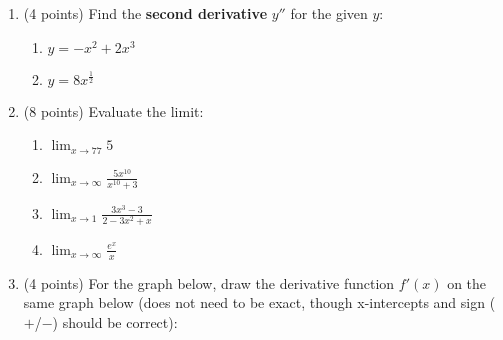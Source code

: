 \documentclass[11pt]{article}
\begin{document}
\begin{enumerate}[itemsep=30pt]
\vspace{20pt}
\item (4 points) Find the \textbf{second derivative} $y''$ for the given $y$:

\begin{enumerate}[itemsep=80pt]
    \item{$y = -x^2 + 2x^3$}
    \item{$y = 8x^{\frac{1}{2}}$}
\end{enumerate}



\newpage

\item (8 points) Evaluate the limit:
\begin{multicols}{2}
\begin{enumerate}[itemsep=80pt]
    \item $\displaystyle{\lim_{x \to 77} 5}$
    \item $\displaystyle{\lim_{x \to \infty} \frac{5x^{10}}{x^{10} + 3}}$
    \item $\displaystyle \lim_{x \to 1} \frac{3x^3 - 3}{2-3x^2 + x} $
    \item $\displaystyle \lim_{x \to \infty} \frac{e^x}{x} $
\end{enumerate}
\end{multicols}

\vspace{50pt}


\item (4 points) For the graph below, draw the derivative function $f'(x)$ on the same graph below (does not need to be exact, though x-intercepts and sign ($+$/$-$) should be correct):

\vspace{10pt}
\begin{center}
\end{center}

\newpage


\end{enumerate}
\end{document}

